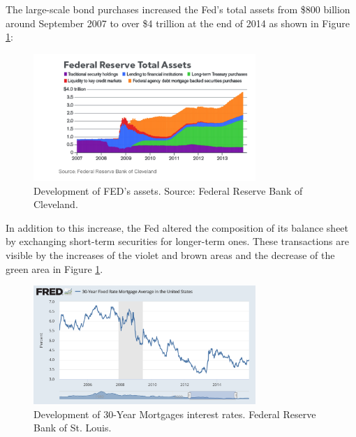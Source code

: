 \documentclass[11pt,a4paper,oneside]{book}
\begin{document}
The large-scale bond purchases increased the Fed's total assets from \$800 billion around September 2007 to over \$4 trillion at the end of 2014 as shown in Figure \ref{fig:QE_assets}:

\begin{figure}[h!]
  \centering
    \includegraphics[width=0.75\textwidth]{QE_assets.png}
    \caption{Development of FED's assets.
    Source: Federal Reserve Bank of Cleveland.}
    \label{fig:QE_assets}
\end{figure}

In addition to this increase, the Fed altered the composition of its balance sheet by exchanging short-term securities for longer-term ones.  These transactions are visible by the increases of the violet and brown areas and the decrease of the green area in Figure \ref{fig:QE_assets}.

\begin{figure}[h!]
  \centering
    \includegraphics[width=0.75\textwidth]{QE_Mortgages.png}
    \caption{Development of 30-Year Mortgages interest rates. Federal Reserve Bank of St. Louis.}
    \label{fig:QE_Mortgages}
\end{figure}
\end{document}
